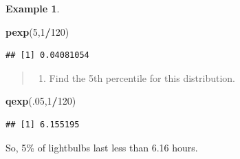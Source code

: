 \documentclass[
]{book}
\newenvironment{Shaded}{\begin{snugshade}}{\end{snugshade}}
\newcommand{\DecValTok}[1]{\textcolor[rgb]{0.00,0.00,0.81}{#1}}
\newcommand{\FunctionTok}[1]{\textcolor[rgb]{0.13,0.29,0.53}{\textbf{#1}}}
\newcommand{\NormalTok}[1]{#1}
\newcommand{\SpecialCharTok}[1]{\textcolor[rgb]{0.81,0.36,0.00}{\textbf{#1}}}
\providecommand{\tightlist}{%
  \setlength{\itemsep}{0pt}\setlength{\parskip}{0pt}}
\theoremstyle{definition}
\theoremstyle{definition}
\newtheorem{example}{Example}[chapter]
\theoremstyle{definition}
\theoremstyle{definition}
\theoremstyle{remark}
\begin{document}
\begin{example}
\begin{Shaded}
\begin{Highlighting}[]
\FunctionTok{pexp}\NormalTok{(}\DecValTok{5}\NormalTok{,}\DecValTok{1}\SpecialCharTok{/}\DecValTok{120}\NormalTok{)}
\end{Highlighting}
\end{Shaded}

\begin{verbatim}
## [1] 0.04081054
\end{verbatim}

\begin{quote}
\begin{enumerate}
\def\labelenumi{\alph{enumi})}
\setcounter{enumi}{2}
\tightlist
\item
  Find the 5th percentile for this distribution.
\end{enumerate}
\end{quote}

\begin{Shaded}
\begin{Highlighting}[]
\FunctionTok{qexp}\NormalTok{(.}\DecValTok{05}\NormalTok{,}\DecValTok{1}\SpecialCharTok{/}\DecValTok{120}\NormalTok{)}
\end{Highlighting}
\end{Shaded}

\begin{verbatim}
## [1] 6.155195
\end{verbatim}

So, 5\% of lightbulbs last less than 6.16 hours.
\end{example}
\end{document}
